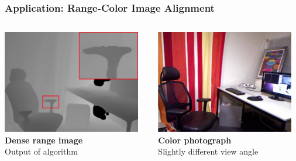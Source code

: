 \documentclass{beamer}
\begin{document}
\begin{frame}
\frametitle{Application: Range-Color Image Alignment}
	\begin{columns}
	\begin{column}[T]{.5\textwidth}
		\includegraphics[height=4.5cm]{deskri.png}
		\\ \textbf{Dense range image}
		\\ Output of algorithm
	\end{column}
	\begin{column}[T]{.5\textwidth}
		\includegraphics[height=4.5cm]{deskph.png}
		\\ \textbf{Color photograph}
		\\ Slightly different view angle
	\end{column}
	\end{columns}
\end{frame}
\end{document}
